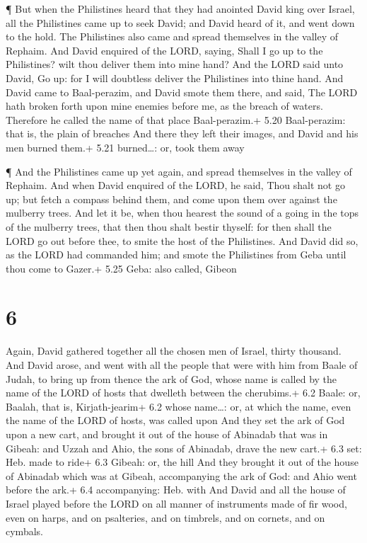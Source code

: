  ¶ But when the Philistines heard that they had anointed
David king over Israel, all the Philistines came up to seek David; and
David heard of it, and went down to the hold.  The
Philistines also came and spread themselves in the valley of Rephaim.
 And David enquired of the LORD, saying, Shall I go up to
the Philistines? wilt thou deliver them into mine hand? And the LORD
said unto David, Go up: for I will doubtless deliver the Philistines
into thine hand.  And David came to Baal-perazim, and David
smote them there, and said, The LORD hath broken forth upon mine enemies
before me, as the breach of waters. Therefore he called the name of that
place Baal-perazim.+ 5.20 Baal-perazim: that is, the plain of breaches
 And there they left their images, and David and his men
burned them.+ 5.21 burned\ldots: or, took them away

 ¶ And the Philistines came up yet again, and spread
themselves in the valley of Rephaim.  And when David
enquired of the LORD, he said, Thou shalt not go up; but fetch a compass
behind them, and come upon them over against the mulberry trees.
 And let it be, when thou hearest the sound of a going in
the tops of the mulberry trees, that then thou shalt bestir thyself: for
then shall the LORD go out before thee, to smite the host of the
Philistines.  And David did so, as the LORD had commanded
him; and smote the Philistines from Geba until thou come to Gazer.+ 5.25
Geba: also called, Gibeon

\hypertarget{section-5}{%
\section{6}\label{section-5}}

 Again, David gathered together all the chosen men of
Israel, thirty thousand.  And David arose, and went with all
the people that were with him from Baale of Judah, to bring up from
thence the ark of God, whose name is called by the name of the LORD of
hosts that dwelleth between the cherubims.+ 6.2 Baale: or, Baalah, that
is, Kirjath-jearim+ 6.2 whose name\ldots: or, at which the name, even
the name of the LORD of hosts, was called upon  And they set
the ark of God upon a new cart, and brought it out of the house of
Abinadab that was in Gibeah: and Uzzah and Ahio, the sons of Abinadab,
drave the new cart.+ 6.3 set: Heb. made to ride+ 6.3 Gibeah: or, the
hill  And they brought it out of the house of Abinadab which
was at Gibeah, accompanying the ark of God: and Ahio went before the
ark.+ 6.4 accompanying: Heb. with  And David and all the
house of Israel played before the LORD on all manner of instruments made
of fir wood, even on harps, and on psalteries, and on timbrels, and on
cornets, and on cymbals.

